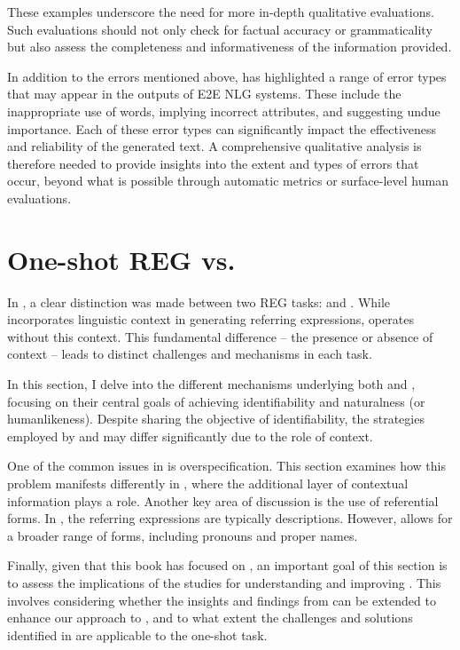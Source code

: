 These examples underscore the need for more in-depth qualitative evaluations. Such evaluations should not only check for factual accuracy or grammaticality but also assess the completeness and informativeness of the information provided.

In addition to the errors mentioned above, \citet{reiter2020} has highlighted a range of error types that may appear in the outputs of E2E NLG systems. These include the inappropriate use of words, implying incorrect attributes, and suggesting undue importance. Each of these error types can significantly impact the effectiveness and reliability of the generated text. A comprehensive qualitative analysis is therefore needed to provide insights into the extent and types of errors that occur, beyond what is possible through automatic metrics or surface-level human evaluations. 


\section{One-shot REG vs. \context}\label{sec:shotversuscontext}

In , a clear distinction was made between two REG tasks: \context and \shot. While \context incorporates linguistic context in generating referring expressions, \shot operates without this context. This fundamental difference -- the presence or absence of context -- leads to distinct challenges and mechanisms in each task.

In this section, I delve into the different mechanisms underlying both \context and \shot, focusing on their central goals of achieving identifiability and naturalness (or humanlikeness). Despite sharing the objective of identifiability, the strategies employed by \context and \shot may differ significantly due to the role of context.

One of the common issues in \shot is overspecification. This section examines how this problem manifests differently in \context, where the additional layer of contextual information plays a role. Another key area of discussion is the use of referential forms. In \shot, the referring expressions are typically descriptions. However, \context allows for a broader range of forms, including pronouns and proper names. 

Finally, given that this book has focused on \context, an important goal of this section is to assess the implications of the \context studies for understanding and improving \shot. This involves considering whether the insights and findings from \context can be extended to enhance our approach to \shot, and to what extent the challenges and solutions identified in \context are applicable to the one-shot task.

